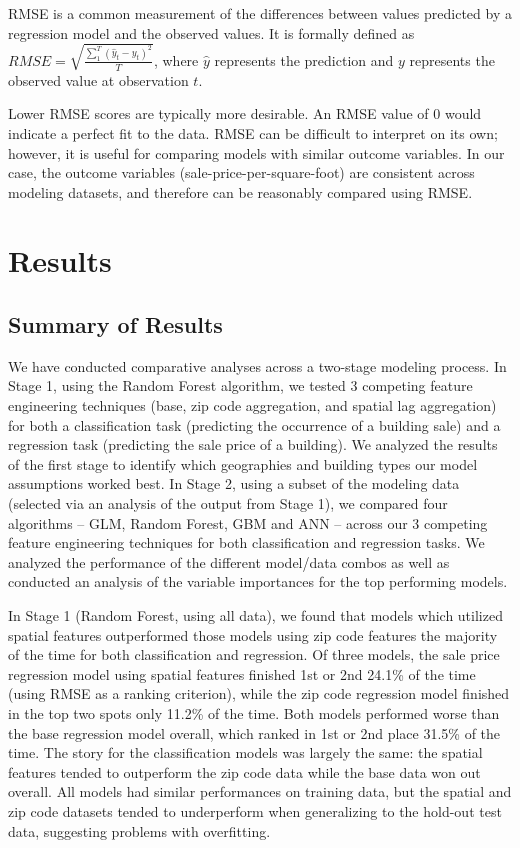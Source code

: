 \documentclass[12pt,]{article}
\begin{document}
RMSE is a common measurement of the differences between values predicted
by a regression model and the observed values. It is formally defined as
\(RMSE = \sqrt{ \frac{\sum_{1}^{T} (\hat{y}_t - y_t)^2}{T} }\), where
\(\hat{y}\) represents the prediction and \(y\) represents the observed
value at observation \(t\).

Lower RMSE scores are typically more desirable. An RMSE value of 0 would
indicate a perfect fit to the data. RMSE can be difficult to interpret
on its own; however, it is useful for comparing models with similar
outcome variables. In our case, the outcome variables
(sale-price-per-square-foot) are consistent across modeling datasets,
and therefore can be reasonably compared using RMSE.

\hypertarget{results}{%
\section{Results}\label{results}}

\hypertarget{summary-of-results}{%
\subsection{Summary of Results}\label{summary-of-results}}

We have conducted comparative analyses across a two-stage modeling
process. In Stage 1, using the Random Forest algorithm, we tested 3
competing feature engineering techniques (base, zip code aggregation,
and spatial lag aggregation) for both a classification task (predicting
the occurrence of a building sale) and a regression task (predicting the
sale price of a building). We analyzed the results of the first stage to
identify which geographies and building types our model assumptions
worked best. In Stage 2, using a subset of the modeling data (selected
via an analysis of the output from Stage 1), we compared four algorithms
-- GLM, Random Forest, GBM and ANN -- across our 3 competing feature
engineering techniques for both classification and regression tasks. We
analyzed the performance of the different model/data combos as well as
conducted an analysis of the variable importances for the top performing
models.

In Stage 1 (Random Forest, using all data), we found that models which
utilized spatial features outperformed those models using zip code
features the majority of the time for both classification and
regression. Of three models, the sale price regression model using
spatial features finished 1st or 2nd 24.1\% of the time (using RMSE as a
ranking criterion), while the zip code regression model finished in the
top two spots only 11.2\% of the time. Both models performed worse than
the base regression model overall, which ranked in 1st or 2nd place
31.5\% of the time. The story for the classification models was largely
the same: the spatial features tended to outperform the zip code data
while the base data won out overall. All models had similar performances
on training data, but the spatial and zip code datasets tended to
underperform when generalizing to the hold-out test data, suggesting
problems with overfitting.
\end{document}
